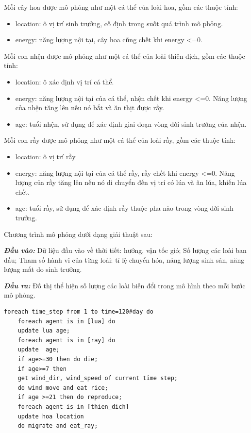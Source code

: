 \documentclass[13pt]{extreport}
\begin{document}
{Mỗi cây hoa được mô phỏng như một cá thể của loài hoa, gồm các thuộc tính:
\begin{itemize}
\item location: ô vị trí sinh trưởng, cố định trong suốt quá trình mô phỏng.
\item energy: năng lượng nội tại, cây hoa cũng chết khi energy <=0.
\end{itemize}

Mỗi con nhện được mô phỏng như một cá thể của loài thiên địch, gồm các thuộc tính:
\begin{itemize}
\item location: ô xác định vị trí cá thể.
\item energy: năng lượng nội tại của cá thể, nhện chết khi energy <=0. Năng lượng của nhện tăng lên nếu nó bắt và ăn thịt được rầy.
\item age: tuổi nhện, sử dụng để xác định giai đoạn vòng đời sinh trưởng của nhện.
\end{itemize}

Mỗi con rầy được mô phỏng như một cá thể của loài rầy, gồm các thuộc tính:
\begin{itemize}
\item location: ô vị trí rầy
\item energy: năng lượng nội tại của cá thể rầy, rầy chết khi energy <=0. Năng lượng của rầy tăng lên nếu nó di chuyển đến vị trí có lúa và ăn lúa, khiến lúa chết.
\item age: tuổi rầy, sử dụng để xác định rầy thuộc pha nào trong vòng đời sinh trưởng.
\end{itemize}

Chương trình mô phỏng dưới dạng giải thuật sau:

\textit{\textbf{Đầu vào:}} Dữ liệu đầu vào về thời tiết: hướng, vận tốc gió; Số lượng các loài ban đầu; Tham số hành vi của từng loài: tỉ lệ chuyển hóa, năng lượng sinh sản, năng lượng mất do sinh trưởng.

\textbf{\textit{Đầu ra:}} Đồ thị thể hiện số lượng các loài biến đổi trong mô hình theo mỗi bước mô phỏng.
\begin{center}
\small{
\begin{verbatim}
foreach time_step from 1 to time=120#day do
	foreach agent is in [lua] do
	update lua age;
	foreach agent is in [ray] do
	update  age;
	if age>=30 then do die;
	if age>=7 then
	get wind_dir, wind_speed of current time step;
	do wind_move and eat_rice;
	if age >=21 then do reproduce;
	foreach agent is in [thien_dich]
	update hoa location
	do migrate and eat_ray;
\end{verbatim}
}
\end{center}

}
\end{document}

